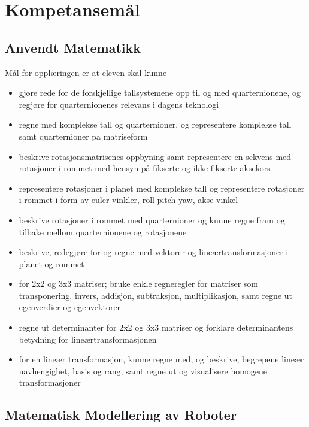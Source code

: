 \section*{Kompetansemål} \label{Sec: Kompetansemaal}

\subsection*{Anvendt Matematikk}

    Mål for opplæringen er at eleven skal kunne

    \begin{itemize}
        \item gjøre rede for de forskjellige tallsystemene opp til og med quarternionene, og regjøre for quarternionenes relevans i dagens teknologi
        \item regne med komplekse tall og quarternioner, og representere komplekse tall samt quarternioner på matriseform
        \item beskrive rotasjonsmatrisenes oppbyning samt representere en sekvens med rotasjoner i rommet med hensyn på fikserte og ikke fikserte aksekors
        \item representere rotasjoner i planet med komplekse tall og representere rotasjoner i rommet i form av euler vinkler, roll-pitch-yaw, akse-vinkel
        \item beskrive rotasjoner i rommet med quarternioner og kunne regne fram og tilbake mellom quarternionene og rotasjonene
        \item beskrive, redegjøre for og regne med vektorer og lineærtransformasjoner i planet og rommet
        \item for 2x2 og 3x3 matriser; bruke enkle regneregler for matriser som transponering, invers, addisjon, subtraksjon, multiplikasjon, samt regne ut egenverdier og egenvektorer
        \item regne ut determinanter for 2x2 og 3x3 matriser og forklare determinantens betydning for lineærtransformasjonen
        \item for en lineær transformasjon, kunne regne med, og beskrive, begrepene lineær uavhengighet, basis og rang, samt regne ut og visualisere homogene transformasjoner
    \end{itemize}


\subsection*{Matematisk Modellering av Roboter}

